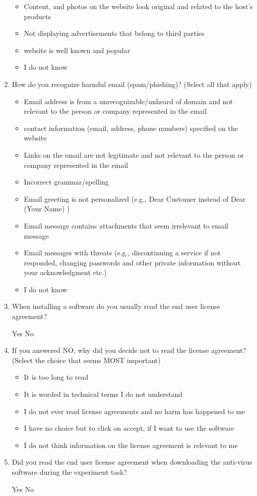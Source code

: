 \documentclass[doctor]{thesis} %
\theoremstyle{plain}
\begin{document}
\begin{enumerate}[noitemsep]
\begin{itemize}[topsep=-6em, label={o}]
\item Content, and photos on the website look original and related to the host's products
\item Not displaying advertisements that belong to third parties
\item website is well known and popular
\item I do not know
\end{itemize}
\item How do you recognize harmful email (spam/phishing)? (Select all that apply)
\begin{itemize}[topsep=-6em, label={o}]
\itemsep-1em 
\item Email address is from a unrecognizable/unheard of domain and not relevant to the person or company represented in the email
\item contact information (email, address, phone numbers) specified on the website
\item Links on the email are not legitimate and not relevant to the person or company represented in the email
\item Incorrect grammar/spelling
\item Email greeting is not personalized (e.g., Dear Customer instead of Dear (Your Name) )
\item Email message contains attachments that seem irrelevant to email message
\item Email messages with threats (e.g., discontinuing a service if not responded, changing passwords and other private information without your acknowledgment etc.)
\item I do not know
\end{itemize}
\item  When installing a software do you usually read the end user license agreement?
\par Yes \hspace{1cm} No
\item If you answered NO, why did you decide not to read the license agreement? (Select the choice that seems MOST important)
\begin{itemize}[topsep=-6em, label={o}]
\itemsep-1em 
\item It is too long to read
\item It is worded in technical terms I do not understand
\item I do not ever read license agreements and no harm has happened to me
\item I have no choice but to click on accept, if I want to use the software
\item I do not think information on the license agreement is relevant to me
\end{itemize}
\item  Did you read the end user license agreement when downloading the anti-virus software during the experiment task?
\par Yes \hspace{1cm} No
\end{enumerate}
\end{document}
